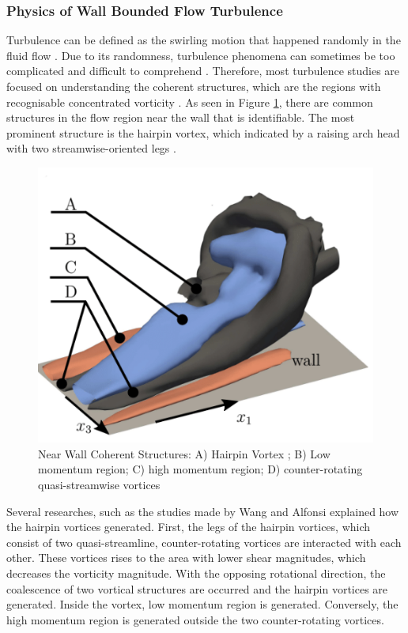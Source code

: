 \subsubsection{Physics of Wall Bounded Flow Turbulence}
\label{sec:litrev_oscwall}
Turbulence can be defined as the swirling motion that happened randomly in the fluid flow \cite{Sreenivasan1999}. Due to its randomness, turbulence phenomena can sometimes be too complicated and difficult to comprehend \cite{Hussain1986}. Therefore, most turbulence studies are focused on understanding the coherent structures, which are the regions with recognisable concentrated vorticity \cite{Fiedler1988}. As seen in Figure \ref{fig:hairpintamas}, there are common structures in the flow region near the wall that is identifiable. The most prominent structure is the hairpin vortex, which indicated by a raising arch head with two streamwise-oriented legs \cite{Wang2015}.
\pagebreak
\begin{figure}[ht]
    \centering
    \includegraphics[width=0.5\linewidth]{Figures/Hairpin2.png}
    \caption{Near Wall Coherent Structures: A) Hairpin Vortex ; B) Low momentum region; C) high momentum region; D) counter-rotating quasi-streamwise vortices~\cite{Tamas2019}}
    \label{fig:hairpintamas}
\end{figure}

Several researches, such as the studies made by Wang \cite{Wang2015} and Alfonsi \cite{Alfonsi2006} explained how the hairpin vortices generated. First, the legs of the hairpin vortices, which consist of two quasi-streamline, counter-rotating vortices are interacted with each other. These vortices rises to the area with lower shear magnitudes, which decreases the vorticity magnitude. With the opposing rotational direction, the coalescence of two vortical structures are occurred and the hairpin vortices are generated. Inside the vortex, low momentum region is generated. Conversely, the high momentum region is generated outside the two counter-rotating vortices.

